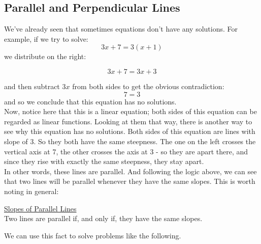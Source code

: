 \subsection{Parallel and Perpendicular Lines}

We’ve already seen that sometimes equations don’t have any solutions. For example, if we try to solve: $$3x+7=3(x+1)$$
we distribute on the right: 

$$3x+7=3x+3$$

and then subtract $3x$ from both sides to get the obvious contradiction:  $$7=3$$ and so we conclude that this equation has no solutions.\\

Now, notice here that this is a linear equation; both sides of this equation can be regarded as linear functions. Looking at them that way, there is another way to see why this equation has no solutions. Both sides of this equation are lines with slope of 3. So they both have the same steepness. The one on the left crosses the vertical axis at 7, the other crosses the axis at 3 - so they are apart there, and since they rise with exactly the same steepness, they stay apart.\\

In other words, these lines are parallel. And following the logic above, we can see that two lines will be parallel whenever they have the same slopes. This is worth noting in general:

\begin{definition}
	\underline{Slopes of Parallel Lines}\\
	\bigskip
	Two lines are parallel if, and only if, they have the same slopes.
\end{definition}

We can use this fact to solve problems like the following.



